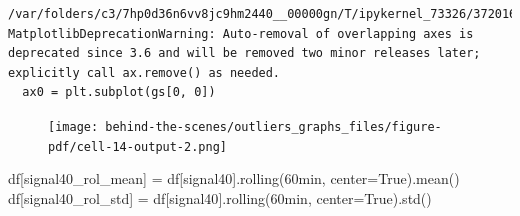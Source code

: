 \documentclass[
  letterpaper,
  DIV=11,
  numbers=noendperiod,
  oneside]{scrreprt}
\newenvironment{Shaded}{\begin{snugshade}}{\end{snugshade}}
\newcommand{\NormalTok}[1]{\textcolor[rgb]{0.00,0.23,0.31}{#1}}
\newcommand{\OperatorTok}[1]{\textcolor[rgb]{0.37,0.37,0.37}{#1}}
\newcommand{\StringTok}[1]{\textcolor[rgb]{0.13,0.47,0.30}{#1}}
\newcommand{\VariableTok}[1]{\textcolor[rgb]{0.07,0.07,0.07}{#1}}
\begin{document}
\begin{verbatim}
/var/folders/c3/7hp0d36n6vv8jc9hm2440__00000gn/T/ipykernel_73326/372016966.py:6: MatplotlibDeprecationWarning: Auto-removal of overlapping axes is deprecated since 3.6 and will be removed two minor releases later; explicitly call ax.remove() as needed.
  ax0 = plt.subplot(gs[0, 0])
\end{verbatim}

\begin{figure}[H]

{\centering \texttt{[image: behind-the-scenes/outliers\_graphs\_files/figure-pdf/cell-14-output-2.png]}

}

\end{figure}

\begin{Shaded}
\begin{Highlighting}[]
\NormalTok{df[}\StringTok{\textquotesingle{}signal40\_rol\_mean\textquotesingle{}}\NormalTok{] }\OperatorTok{=}\NormalTok{ df[}\StringTok{\textquotesingle{}signal40\textquotesingle{}}\NormalTok{].rolling(}\StringTok{\textquotesingle{}60min\textquotesingle{}}\NormalTok{, center}\OperatorTok{=}\VariableTok{True}\NormalTok{).mean()}
\NormalTok{df[}\StringTok{\textquotesingle{}signal40\_rol\_std\textquotesingle{}}\NormalTok{] }\OperatorTok{=}\NormalTok{ df[}\StringTok{\textquotesingle{}signal40\textquotesingle{}}\NormalTok{].rolling(}\StringTok{\textquotesingle{}60min\textquotesingle{}}\NormalTok{, center}\OperatorTok{=}\VariableTok{True}\NormalTok{).std()}
\end{Highlighting}
\end{Shaded}
\end{document}
